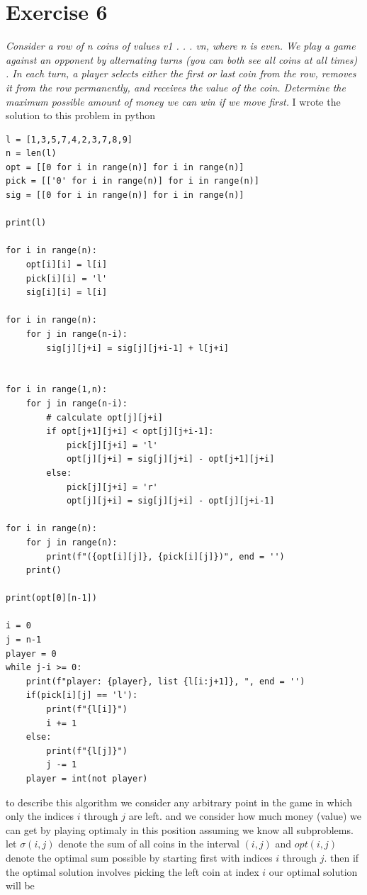 \documentclass{amsart}
\begin{document}
\section{Exercise 6}
\emph{
    Consider a row of n coins of values v1 . . . vn, where n is even. We play a game against an opponent by alternating turns (you can both see all coins 
    at all times) . In each turn, a player selects either the first or last coin from the row, removes it from the row permanently, and receives the value
    of the coin. Determine the maximum possible amount of money we can win if we move first.
}
I wrote the solution to this problem in python
\begin{lstlisting}
l = [1,3,5,7,4,2,3,7,8,9]
n = len(l)
opt = [[0 for i in range(n)] for i in range(n)]
pick = [['0' for i in range(n)] for i in range(n)]
sig = [[0 for i in range(n)] for i in range(n)]

print(l)

for i in range(n):
    opt[i][i] = l[i]
    pick[i][i] = 'l'
    sig[i][i] = l[i]

for i in range(n):
    for j in range(n-i):
        sig[j][j+i] = sig[j][j+i-1] + l[j+i]


for i in range(1,n):
    for j in range(n-i):
        # calculate opt[j][j+i]
        if opt[j+1][j+i] < opt[j][j+i-1]:
            pick[j][j+i] = 'l'
            opt[j][j+i] = sig[j][j+i] - opt[j+1][j+i]
        else:
            pick[j][j+i] = 'r'
            opt[j][j+i] = sig[j][j+i] - opt[j][j+i-1]

for i in range(n):
    for j in range(n):
        print(f"({opt[i][j]}, {pick[i][j]})", end = '')
    print()

print(opt[0][n-1])

i = 0
j = n-1
player = 0
while j-i >= 0:
    print(f"player: {player}, list {l[i:j+1]}, ", end = '')
    if(pick[i][j] == 'l'):
        print(f"{l[i]}")
        i += 1
    else:
        print(f"{l[j]}")
        j -= 1
    player = int(not player)

\end{lstlisting}
to describe this algorithm we consider any arbitrary point in the game
in which only the indices $i$ through $j$ are left. and we consider how much
money (value) we can get by playing optimaly in this position assuming we know all subproblems.
let $\sigma(i,j)$ denote the sum of all coins in the interval $(i,j)$ and $opt(i,j)$ denote the optimal sum possible 
by starting first with indices $i$ through $j$.
then  if the optimal solution involves picking the left coin at index $i$ our optimal solution will be
\end{document}
